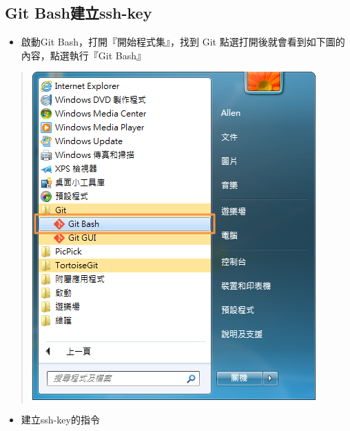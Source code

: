 \documentclass[letterpaper,10pt,english]{sphinxmanual}
\begin{document}
\subsection{Git Bash建立ssh-key}
\label{_doc/writing/index:ssh-key-gitbash}\label{_doc/writing/index:git-bashssh-key}\begin{itemize}
\item {} 
啟動Git Bash，打開『開始程式集』，找到 Git 點選打開後就會看到如下圖的內容，點選執行『Git Bash』

\end{itemize}
\begin{quote}

\includegraphics{gitBash-001.png}
\end{quote}
\begin{itemize}
\item {} 
建立ssh-key的指令

\end{itemize}
\end{document}
